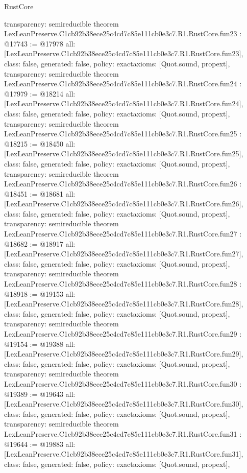 \begin{lexlean}{RustCore}
\begin{coremodule}
{  transparency: semireducible
}
theorem LexLeanPreserve.C1cb92b38ece25c4cd7c85e111cb0e3c7.R1.RustCore.fun23 : @17743 := @17978 {
  all: [LexLeanPreserve.C1cb92b38ece25c4cd7c85e111cb0e3c7.R1.RustCore.fun23],
  class: false,
  generated: false,
  policy: exact{axioms: [Quot.sound, propext]},
  transparency: semireducible
}
theorem LexLeanPreserve.C1cb92b38ece25c4cd7c85e111cb0e3c7.R1.RustCore.fun24 : @17979 := @18214 {
  all: [LexLeanPreserve.C1cb92b38ece25c4cd7c85e111cb0e3c7.R1.RustCore.fun24],
  class: false,
  generated: false,
  policy: exact{axioms: [Quot.sound, propext]},
  transparency: semireducible
}
theorem LexLeanPreserve.C1cb92b38ece25c4cd7c85e111cb0e3c7.R1.RustCore.fun25 : @18215 := @18450 {
  all: [LexLeanPreserve.C1cb92b38ece25c4cd7c85e111cb0e3c7.R1.RustCore.fun25],
  class: false,
  generated: false,
  policy: exact{axioms: [Quot.sound, propext]},
  transparency: semireducible
}
theorem LexLeanPreserve.C1cb92b38ece25c4cd7c85e111cb0e3c7.R1.RustCore.fun26 : @18451 := @18681 {
  all: [LexLeanPreserve.C1cb92b38ece25c4cd7c85e111cb0e3c7.R1.RustCore.fun26],
  class: false,
  generated: false,
  policy: exact{axioms: [Quot.sound, propext]},
  transparency: semireducible
}
theorem LexLeanPreserve.C1cb92b38ece25c4cd7c85e111cb0e3c7.R1.RustCore.fun27 : @18682 := @18917 {
  all: [LexLeanPreserve.C1cb92b38ece25c4cd7c85e111cb0e3c7.R1.RustCore.fun27],
  class: false,
  generated: false,
  policy: exact{axioms: [Quot.sound, propext]},
  transparency: semireducible
}
theorem LexLeanPreserve.C1cb92b38ece25c4cd7c85e111cb0e3c7.R1.RustCore.fun28 : @18918 := @19153 {
  all: [LexLeanPreserve.C1cb92b38ece25c4cd7c85e111cb0e3c7.R1.RustCore.fun28],
  class: false,
  generated: false,
  policy: exact{axioms: [Quot.sound, propext]},
  transparency: semireducible
}
theorem LexLeanPreserve.C1cb92b38ece25c4cd7c85e111cb0e3c7.R1.RustCore.fun29 : @19154 := @19388 {
  all: [LexLeanPreserve.C1cb92b38ece25c4cd7c85e111cb0e3c7.R1.RustCore.fun29],
  class: false,
  generated: false,
  policy: exact{axioms: [Quot.sound, propext]},
  transparency: semireducible
}
theorem LexLeanPreserve.C1cb92b38ece25c4cd7c85e111cb0e3c7.R1.RustCore.fun30 : @19389 := @19643 {
  all: [LexLeanPreserve.C1cb92b38ece25c4cd7c85e111cb0e3c7.R1.RustCore.fun30],
  class: false,
  generated: false,
  policy: exact{axioms: [Quot.sound, propext]},
  transparency: semireducible
}
theorem LexLeanPreserve.C1cb92b38ece25c4cd7c85e111cb0e3c7.R1.RustCore.fun31 : @19644 := @19883 {
  all: [LexLeanPreserve.C1cb92b38ece25c4cd7c85e111cb0e3c7.R1.RustCore.fun31],
  class: false,
  generated: false,
  policy: exact{axioms: [Quot.sound, propext]},
}
\end{coremodule}
\end{lexlean}
